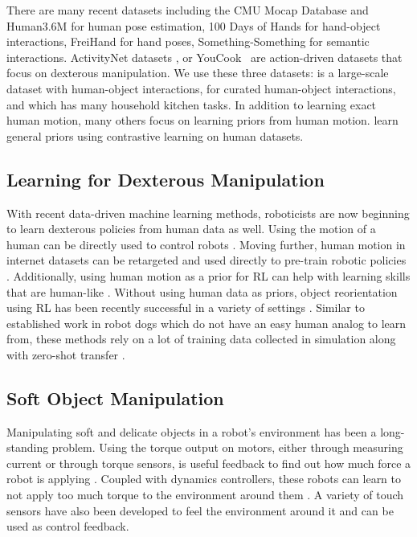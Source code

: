There are many recent datasets including the CMU Mocap Database and Human3.6M \citep{ionescu2013human3} for human pose estimation, 100 Days of Hands \citep{100doh} for hand-object interactions,  FreiHand \citep{Freihand2019} for hand poses, Something-Something \citep{SomethingSomething_ICCV} for semantic interactions. ActivityNet datasets \citep{caba2015activitynet}, or YouCook~\citep{youcook} are action-driven datasets that focus on dexterous manipulation.  We use these three datasets: \citep{ego4d} is a large-scale dataset with human-object interactions, \citep{Liu_2022_CVPR} for curated human-object interactions, and \citep{EPICKITCHENS} which has many household kitchen tasks.  In addition to learning exact human motion, many others focus on learning priors from human motion. \cite{ma2022vip, nair2022r3m} learn general priors using contrastive learning on human datasets. 

\subsection{Learning for Dexterous Manipulation}
With recent data-driven machine learning methods, roboticists are now beginning to learn dexterous policies from human data as well.  Using the motion of a human can be directly used to control robots \citep{dexpilot, sivakumar2022robotic, qin2022from}. Moving further, human motion in internet datasets can be retargeted and used directly to pre-train robotic policies \citep{shaw2022video, mandikal2022dexvip}. Additionally, using human motion as a prior for RL can help with learning skills that are human-like \cite{rajeswaran2017learning, peng2018deepmimic, mandikal2021dexvip}. Without using human data as priors, object reorientation using RL has been recently successful in a variety of settings  \citep{andrychowicz2020learning, chen2022visual}.  Similar to established work in robot dogs which do not have an easy human analog to learn from, these methods rely on a lot of training data collected in simulation along with zero-shot transfer \citep{agarwal2023legged, margolis2022rapid}.

\subsection{Soft Object Manipulation}
Manipulating soft and delicate objects in a robot's environment has been a long-standing problem. Using the torque output on motors, either through measuring current or through torque sensors, is useful feedback to find out how much force a robot is applying \cite{yoshikawa1985dynamic, asada1991robot}.  Coupled with dynamics controllers, these robots can learn to not apply too much torque to the environment around them \cite{lynch2017modern, liu2017designing, khatib1987unified}.   A variety of touch sensors \cite{si2023robotsweater, yuan2017gelsight, bhirangi2021reskin, SSundaram:2019:STAG} have also been developed to  feel the environment around it and can be used as control feedback.  

